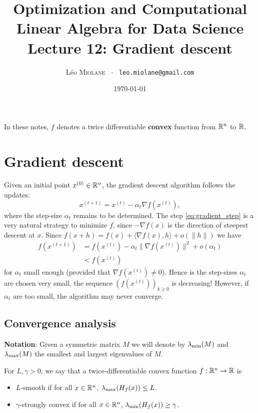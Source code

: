 \documentclass[11pt,nocut]{article}
\title{\vspace{-2.0cm}%
	Optimization and Computational Linear Algebra for Data Science\\
Lecture 12: Gradient descent}
\author{Léo \textsc{Miolane} \ $\cdot$ \ \texttt{leo.miolane@gmail.com}}
\date{\today}
\begin{document}
\maketitle


\begin{center}
In these notes, $f$ denotes a twice differentiable \textbf{convex} function from $\mathbb{R}^n$ to $\mathbb{R}$.
\end{center}

\section{Gradient descent}

Given an initial point $x^{(0)} \in \mathbb{R}^n$, the gradient descent algorithm follows the updates:
\begin{equation}\label{eq:gradient_step}
x^{(t+1)} = x^{(t)} - \alpha_t \nabla f(x^{(t)}),
\end{equation}
where the step-size $\alpha_t$ remains to be determined.
The step \eqref{eq:gradient_step} is a very natural strategy to minimize $f$, since $-\nabla f(x)$ is the direction of steepest descent at $x$. Since $f(x+h) = f(x) + \langle \nabla f(x), h \rangle + o(\|h\|)$ we have
\begin{align*}
f(x^{(t+1)}) 
&= f(x^{(t)}) - \alpha_t \| \nabla f(x^{(t)}) \|^2 + o(\alpha_t) \\
&< f(x^{(t)}) 
\end{align*}
for $\alpha_t$ small enough (provided that $\nabla f(x^{(t)}) \neq 0$).
Hence is the step-sizes $\alpha_t$ are chosen very small, the sequence $(f(x^{(t)}))_{k \geq 0}$ is decreasing!
However, if $\alpha_t$ are too small, the algorithm may never converge.

\subsection{Convergence analysis}

\textbf{Notation}: Given a symmetric matrix $M$ we will denote by $\lambda_{\rm min}(M)$ and $\lambda_{\rm max}(M)$ the smallest and largest eigenvalues of $M$. 
\begin{definition}
	For $L,\gamma >0$, we say that a twice-differentiable convex function $f: \mathbb{R}^n \to \mathbb{R}$ is
	\begin{itemize}
		\item $L$-smooth if for all $x \in \mathbb{R}^n$, $\lambda_{\rm max}(H_f(x)) \leq L$.
		\item $\gamma$-strongly convex if for all $x \in \mathbb{R}^n$, $\lambda_{\rm min}(H_f(x)) \geq \gamma$.
	\end{itemize}
\end{definition}
\end{document}
